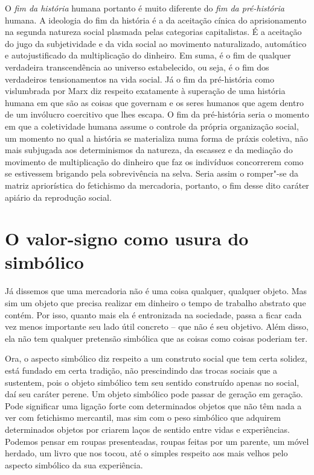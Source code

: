 {O \emph{fim da história} humana portanto é muito diferente do \emph{fim
da pré-história} humana. A ideologia do fim da história é a da aceitação
cínica do aprisionamento na segunda natureza social plasmada pelas
categorias capitalistas. É a aceitação do jugo da subjetividade e da
vida social ao movimento naturalizado, automático e autojustificado da
multiplicação do dinheiro. Em suma, é o fim de qualquer verdadeira
transcendência ao universo estabelecido, ou seja, é o fim dos
verdadeiros tensionamentos na vida social. Já o fim da pré-história como
vislumbrada por Marx diz respeito exatamente à superação de uma história
humana em que são as coisas que governam e os seres humanos que agem
dentro de um invólucro coercitivo que lhes escapa. O fim da pré-história
seria o momento em que a coletividade humana assume o controle da
própria organização social, um momento no qual a história se materializa
numa forma de práxis coletiva, não mais subjugada aos determinismos da
natureza, da escassez e da mediação do movimento de multiplicação do
dinheiro que faz os indivíduos concorrerem como se estivessem brigando
pela sobrevivência na selva. Seria assim o romper"-se da matriz
apriorística do fetichismo da mercadoria, portanto, o fim desse dito
caráter apiário da reprodução social.

\section{O valor-signo como usura do simbólico}

Já dissemos que uma mercadoria não é uma coisa qualquer, qualquer
objeto. Mas sim um objeto que precisa realizar em dinheiro o tempo de
trabalho abstrato que contém. Por isso, quanto mais ela é entronizada na
sociedade, passa a ficar cada vez menos importante seu lado útil
concreto -- que não é seu objetivo. Além disso, ela não tem qualquer
pretensão simbólica que as coisas como coisas poderiam ter.

Ora, o aspecto simbólico diz respeito a um construto social que tem
certa solidez, está fundado em certa tradição, não prescindindo das
trocas sociais que a sustentem, pois o objeto simbólico tem seu sentido
construído apenas no social, daí seu caráter perene. Um objeto simbólico
pode passar de geração em geração. Pode significar uma ligação forte com
determinados objetos que não têm nada a ver com fetichismo mercantil,
mas sim com o peso simbólico que adquirem determinados objetos por
criarem laços de sentido entre vidas e experiências. Podemos pensar em
roupas presenteadas, roupas feitas por um parente, um móvel herdado, um
livro que nos tocou, até o simples respeito aos mais velhos pelo aspecto
simbólico da sua experiência.

}
